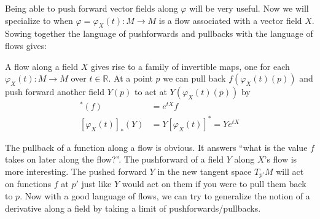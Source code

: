 \documentclass[../master.tex]{subfiles}
\begin{document}
		Being able to push forward vector fields along $\varphi$ will be very useful. Now we will specialize to when $\varphi = \varphi_X(t): M \rightarrow M$ is a flow associated with a vector field $X$. Sowing together the language of pushforwards and pullbacks with the language of flows gives:
		\begin{obs}
			A flow along a field $X$ gives rise to a family of invertible maps, one for each $\varphi_X(t): M \rightarrow M$ over $t \in \mathbb R$. At a point $p$ we can pull back $f(\varphi_X(t)(p))$ and push forward another field $Y(p)$ to act at $Y(\varphi_X(t)(p))$ by
			\begin{align}
				[\varphi_X (t)]^* (f) &= e^{t X} f  \\
				[\varphi_X (t)]_* (Y) &= Y [\varphi_X (t)]^*  = Y e^{tX}
			\end{align}
		\end{obs}
		The pullback of a function along a flow is obvious. It answers ``what is the value $f$ takes on later along the flow?''. The pushforward of a field $Y$ along $X$'s flow is more interesting. The pushed forward $Y$ in the new tangent space $T_{p'} M$ will act on functions $f$ at $p'$ just like $Y$ would act on them if you were to pull them back to $p$. Now with a good language of flows, we can try to generalize the notion of a derivative along a field by taking a limit of pushforwards/pullbacks. \\
		
		
		
		
\end{document}

